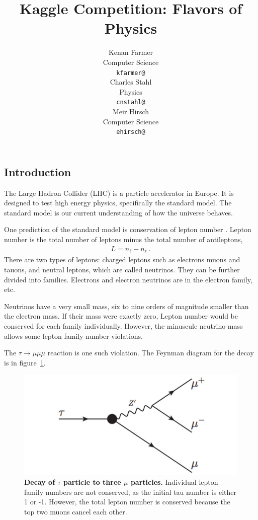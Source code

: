 \documentclass{article} %
\title{Kaggle Competition: Flavors of Physics}
\author{
Kenan Farmer\\
Computer Science\\
\texttt{kfarmer@} \\
\And
Charles Stahl \\
Physics \\
\texttt{cnstahl@} \\
\And
Meir Hirsch\\
Computer Science \\
\texttt{ehirsch@} \\
}
\begin{document}
\maketitle

\subsection*{Introduction}

The Large Hadron Collider (LHC) is a particle accelerator in Europe. It is designed to test high energy physics, specifically the standard model. The standard model is our current understanding of how the universe behaves. 

One prediction of the standard model is conservation of lepton number \cite{griff87}. Lepton number is the total number of leptons minus the total number of antileptons,
\begin{align}
L=n_{\ell }-n_{\overline {\ell }}~.
\end{align}
There are two types of leptons: charged leptons such as electrons muons and tauons, and neutral leptons, which are called neutrinos. They can be further divided into families. Electrons and electron neutrinos are in the electron family, etc.

Neutrinos have a very small mass, six to nine orders of magnitude smaller than the electron mass. If their mass were exactly zero, Lepton number would be conserved for each family individually. However, the minuscule neutrino mass allows some lepton family number violations. 

The $\tau\to\mu\mu\mu$ reaction is one such violation. The Feynman diagram for the decay is in figure~\ref{fig:feyn}.

\begin{figure}[hb]
	\centering
	\includegraphics[width=.5\textwidth]{front_page}
	\caption{\textbf{Decay of $\tau$ particle to three $\mu$ particles.} Individual lepton family numbers are not conserved, as the initial tau number is either 1 or -1. However, the total lepton number is conserved because the top two muons cancel each other.}
	\label{fig:feyn}
\end{figure}
\end{document}
